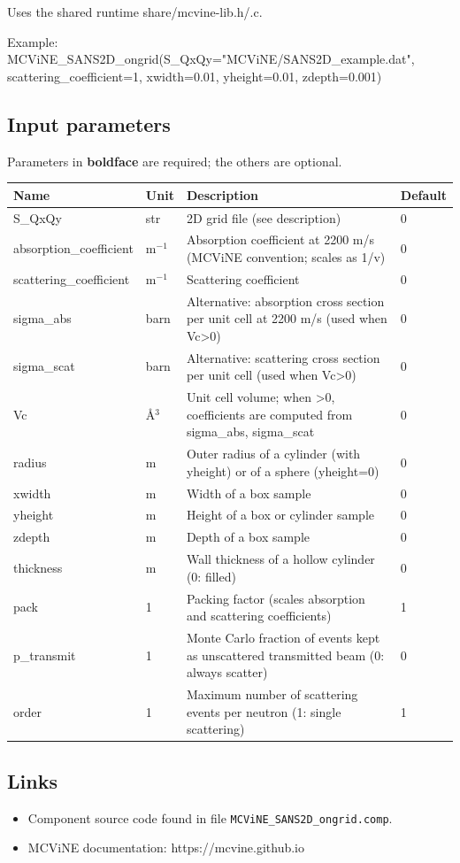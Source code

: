 Uses the shared runtime share/mcvine-lib.h/.c.

Example: MCViNE\_SANS2D\_ongrid(S\_QxQy="MCViNE/SANS2D\_example.dat", scattering\_coefficient=1, xwidth=0.01, yheight=0.01, zdepth=0.001)

\subsection*{Input parameters}
Parameters in \textbf{boldface} are required; the others are optional.

\begin{longtable}{p{}p{}p{}p{}}
\toprule
\textbf{Name} & \textbf{Unit} & \textbf{Description} & \textbf{Default} \\
\midrule
\endhead
S\_QxQy & str & 2D grid file (see description) & 0 \\
absorption\_coefficient & m$^{-1}$ & Absorption coefficient at 2200 m/s (MCViNE convention; scales as 1/v) & 0 \\
scattering\_coefficient & m$^{-1}$ & Scattering coefficient & 0 \\
sigma\_abs & barn & Alternative: absorption cross section per unit cell at 2200 m/s (used when Vc\textgreater{}0) & 0 \\
sigma\_scat & barn & Alternative: scattering cross section per unit cell (used when Vc\textgreater{}0) & 0 \\
Vc & \AA{}$^{3}$ & Unit cell volume; when \textgreater{}0, coefficients are computed from sigma\_abs, sigma\_scat & 0 \\
radius & m & Outer radius of a cylinder (with yheight) or of a sphere (yheight=0) & 0 \\
xwidth & m & Width of a box sample & 0 \\
yheight & m & Height of a box or cylinder sample & 0 \\
zdepth & m & Depth of a box sample & 0 \\
thickness & m & Wall thickness of a hollow cylinder (0: filled) & 0 \\
pack & 1 & Packing factor (scales absorption and scattering coefficients) & 1 \\
p\_transmit & 1 & Monte Carlo fraction of events kept as unscattered transmitted beam (0: always scatter) & 0 \\
order & 1 & Maximum number of scattering events per neutron (1: single scattering) & 1 \\
\bottomrule
\end{longtable}

\subsection*{Links}
\begin{itemize}
  \item Component source code found in file \texttt{MCViNE\_SANS2D\_ongrid.comp}.
  \item MCViNE documentation: https://mcvine.github.io
\end{itemize}
